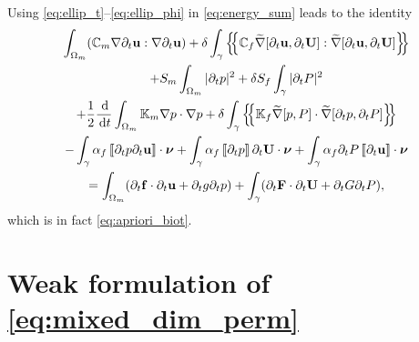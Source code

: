\documentclass[a4paper]{article}
\numberwithin{equation}{section}
\def\agrad{\widetilde\nabla}
\def\avg#1{\left\{\mskip-5mu\left\{#1\right\}\mskip-5mu\right\}}
\def\CC{\tn C}
\def\d {\,{\rm d}}
\def\ddt#1{\frac{\d #1}{\d t}}
\def\dt{\prtl_t}
\def\FF{\vc F}
\def\ff{\vc f}
\def\jmp#1{\left\llbracket #1 \right\rrbracket}
\def\nnu{\boldsymbol\nu}
\def\prtl{\partial}
\def\tn#1{{\mathbb{#1}}}    %
\def\U{\vc U}
\def\uu{\vc u}
\def\vc#1{\mathbf{#1}}     %
\newcommand{\mls}[1]{\begin{multline*}#1\end{multline*}}
\begin{document}
Using \eqref{eq:ellip_t}--\eqref{eq:ellip_phi} in \eqref{eq:energy_sum} leads to the identity
\mls{ \int_{\Omega_m}(\CC_m\nabla\dt\uu:\nabla\dt\uu ) + \delta\int_\gamma\avg{\CC_f\agrad[\dt\uu,\dt\U]:\agrad[\dt\uu,\dt\U]}\\
+ S_m\int_{\Omega_m}|\dt p|^2 + \delta S_f\int_\gamma|\dt P|^2\\
+ \frac12\ddt{}\int_{\Omega_m}\tn K_m\nabla p\cdot\nabla p
+ \delta\int_\gamma\avg{\tn K_f\agrad[p,P]\cdot\agrad[\dt p,\dt P]} \\
- \int_\gamma\alpha_f\jmp{\dt p \dt\uu}\cdot\nnu
+ \int_\gamma\alpha_f\jmp{\dt p}\dt\U\cdot\nnu
+ \int_\gamma\alpha_f\dt P\jmp{\dt\uu}\cdot\nnu\\
= \int_{\Omega_m}(\dt\ff\cdot\dt\uu + \dt g \dt p) + \int_\gamma(\dt\FF\cdot\dt\U + \dt G \dt P), }
which is in fact \eqref{eq:apriori_biot}.



\section{Weak formulation of \eqref{eq:mixed_dim_perm}}\label{sec:app_weak_form}
\end{document}
